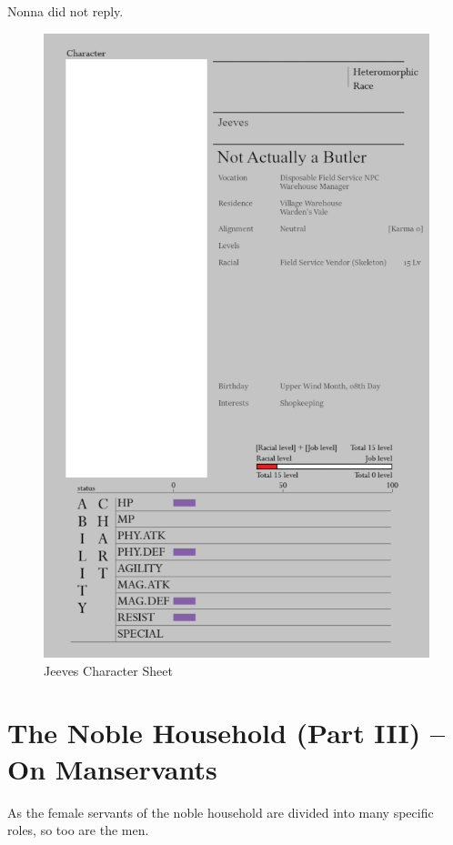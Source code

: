 Nonna did not reply.


\begin{figure}
    \centering
    \includegraphics[width=1\textwidth]{images/b3h4A7o.png}
    \caption*{Jeeves Character Sheet}
\end{figure}

\section*{The Noble Household (Part III) – On Manservants}

As the female servants of the noble household are divided into many specific roles, so too are the men.

